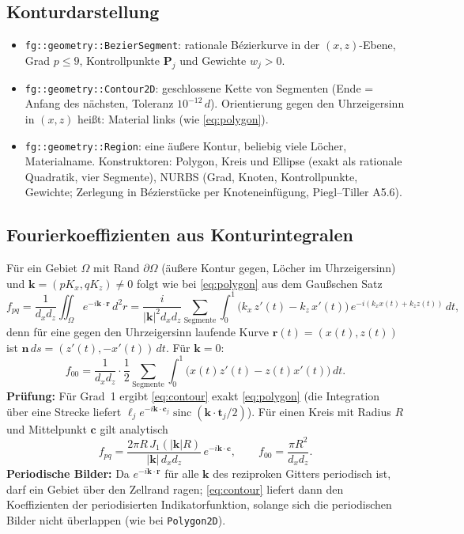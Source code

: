 \subsection{Konturdarstellung}
\begin{itemize}[nosep]
  \item \verb|fg::geometry::BezierSegment|: rationale Bézierkurve in der $(x,z)$-Ebene, Grad $p\le9$,
        Kontrollpunkte $\mathbf P_j$ und Gewichte $w_j>0$.
  \item \verb|fg::geometry::Contour2D|: geschlossene Kette von Segmenten (Ende = Anfang des nächsten, Toleranz
        $10^{-12}\,d$). Orientierung gegen den Uhrzeigersinn in $(x,z)$ heißt: Material links (wie \eqref{eq:polygon}).
  \item \verb|fg::geometry::Region|: eine äußere Kontur, beliebig viele Löcher, Materialname.
        Konstruktoren: Polygon, Kreis und Ellipse (exakt als rationale Quadratik, vier Segmente),
        NURBS (Grad, Knoten, Kontrollpunkte, Gewichte; Zerlegung in Bézierstücke per Knoteneinfügung, Piegl--Tiller A5.6).
\end{itemize}

\subsection{Fourierkoeffizienten aus Konturintegralen}
Für ein Gebiet $\Omega$ mit Rand $\partial\Omega$ (äußere Kontur gegen, Löcher im Uhrzeigersinn) und
$\mathbf k=(pK_x,qK_z)\neq0$ folgt wie bei \eqref{eq:polygon} aus dem Gaußschen Satz
\begin{equation}
  f_{pq}=\frac{1}{d_xd_z}\iint_\Omega e^{-i\mathbf k\cdot\mathbf r}\,d^2r
  =\frac{i}{|\mathbf k|^2d_xd_z}\sum_{\text{Segmente}}\int_0^1\big(k_x\,z'(t)-k_z\,x'(t)\big)\,
  e^{-i(k_xx(t)+k_zz(t))}\,dt,
  \label{eq:contour}
\end{equation}
denn für eine gegen den Uhrzeigersinn laufende Kurve $\mathbf r(t)=(x(t),z(t))$ ist $\mathbf n\,ds=(z'(t),-x'(t))\,dt$.
Für $\mathbf k=0$:
\begin{equation}
  f_{00}=\frac{1}{d_xd_z}\cdot\frac12\sum_{\text{Segmente}}\int_0^1\big(x(t)z'(t)-z(t)x'(t)\big)\,dt .
  \label{eq:contour0}
\end{equation}
\textbf{Prüfung:} Für Grad~1 ergibt \eqref{eq:contour} exakt \eqref{eq:polygon} (die Integration über eine Strecke
liefert $\ell_je^{-i\mathbf k\cdot\mathbf c_j}\operatorname{sinc}(\mathbf k\cdot\mathbf t_j/2)$).
Für einen Kreis mit Radius $R$ und Mittelpunkt $\mathbf c$ gilt analytisch
\begin{equation}
  f_{pq}=\frac{2\pi R\,J_1(|\mathbf k|R)}{|\mathbf k|\,d_xd_z}\,e^{-i\mathbf k\cdot\mathbf c},\qquad f_{00}=\frac{\pi R^2}{d_xd_z}.
  \label{eq:circle}
\end{equation}
\textbf{Periodische Bilder:} Da $e^{-i\mathbf k\cdot\mathbf r}$ für alle $\mathbf k$ des reziproken Gitters periodisch
ist, darf ein Gebiet über den Zellrand ragen; \eqref{eq:contour} liefert dann den Koeffizienten der periodisierten
Indikatorfunktion, solange sich die periodischen Bilder nicht überlappen (wie bei \verb|Polygon2D|).

